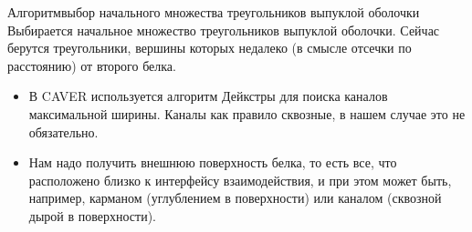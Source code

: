 \documentclass[10pt, xcolor={dvipsnames}]{beamer}
\begin{document}
\begin{frame}{Алгоритм}{выбор начального множества треугольников выпуклой оболочки}
Выбирается начальное множество треугольников выпуклой оболочки. Сейчас берутся треугольники, вершины которых недалеко (в смысле отсечки по расстоянию) от второго белка.

\begin{itemize}
\item В CAVER используется алгоритм Дейкстры для поиска каналов максимальной ширины. Каналы как правило сквозные, в нашем случае это не обязательно.
\item Нам надо получить внешнюю поверхность белка, то есть все, что расположено близко к интерфейсу взаимодействия, и при этом может быть, например, карманом (углублением в поверхности) или каналом (сквозной дырой в поверхности).
\end{itemize}
\end{frame}
\end{document}
